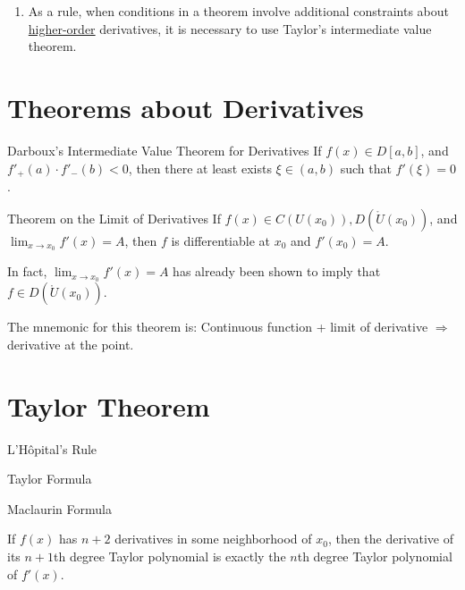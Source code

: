 \documentclass[11pt]{../../TexTemplate/elegantbook}
\begin{document}
\begin{note}
\begin{enumerate}
    \item As a rule, when conditions in a theorem involve additional constraints about \underline{higher-order} derivatives, 
        it is necessary to use Taylor's intermediate value theorem.
\end{enumerate}
\end{note}



\section{Theorems about Derivatives}

\begin{theorem}{Darboux's Intermediate Value Theorem for Derivatives}
    If \(f(x)\in D[a,b]\), and \(f'_{+}(a)\cdot f'_{-}(b)<0\),
    then there at least exists \(\xi\in (a,b)\) such that \(f'(\xi) = 0\).
\end{theorem}

\begin{theorem}{Theorem on the Limit of Derivatives}
    If \(f(x)\in C(U(x_{0})),D(\mathring{U}(x_{0}))\), and \(\lim_{x \to x_{0}} f'(x) = A\),
    then \(f\) is differentiable at \(x_{0}\) and \(f'(x_{0}) = A\).
\end{theorem}
\begin{remark}
    In fact, \(\lim_{x \to x_{0}} f'(x) = A\) has already been shown to imply that \(f\in D(\mathring{U}(x_{0}))\).

    The mnemonic for this theorem is:
    Continuous function + limit of derivative \(\Rightarrow\) derivative at the point.
\end{remark}

\section{Taylor Theorem}
\begin{leftbarTitle}{L'Hôpital's Rule}\end{leftbarTitle}

\begin{leftbarTitle}{Taylor Formula}\end{leftbarTitle}


\begin{leftbarTitle}{Maclaurin Formula}\end{leftbarTitle}
\begin{lemma}
    If \(f(x)\) has \(n+2\) derivatives in some neighborhood of \(x_{0}\), 
    then the derivative of its \(n+1\)th degree Taylor polynomial 
    is exactly the \(n\)th degree Taylor polynomial of \(f'(x)\).
\end{lemma}
\end{document}
